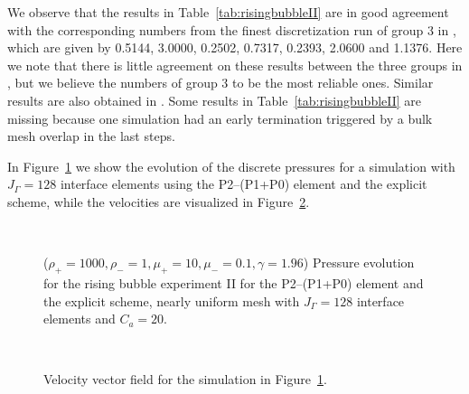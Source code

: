 We observe that the results in Table~\ref{tab:risingbubbleII}
are in good agreement with the corresponding numbers from the finest
discretization run of group 3 in \cite{HysingTKPBGT09}, which are given by
0.5144, 3.0000, 0.2502, 0.7317, 0.2393, 2.0600 and 1.1376. Here we note that
there is little agreement on these results between the three groups in
\cite{HysingTKPBGT09}, but we believe the numbers of group 3 to be the most
reliable ones. Similar results are also obtained in \cite{fluidfbp}. Some
results in Table~\ref{tab:risingbubbleII} are missing because one simulation
had an early termination triggered by a bulk mesh overlap in the last steps.

In Figure~\ref{fig:risingbubbleIIpressure} we show the evolution of the discrete
pressures for a simulation with $J_\Gamma=128$ interface elements using the
P2--(P1+P0) element and the explicit scheme, while the velocities are visualized
in Figure~\ref{fig:risingbubbleIIvelocity}.
\begin{figure}[htbp]
\centering
{}
\\
\caption[Navier--Stokes rising bubble II pressure]
{($\rho_+ = 1000,\rho_- = 1,\mu_+ = 10,\mu_- =0.1,\gamma = 1.96$)
Pressure evolution for the rising bubble experiment II for the P2--(P1+P0)
element and the explicit scheme, nearly uniform mesh with $J_\Gamma=128$
interface elements and $C_a=20$\textdegree.}
\label{fig:risingbubbleIIpressure}
\end{figure}

\begin{figure}[htbp]
\centering
{}
\\
\caption[Navier--Stokes rising bubble II velocity]
{Velocity vector field for the simulation in
Figure~\ref{fig:risingbubbleIIpressure}.}
\label{fig:risingbubbleIIvelocity}
\end{figure}

